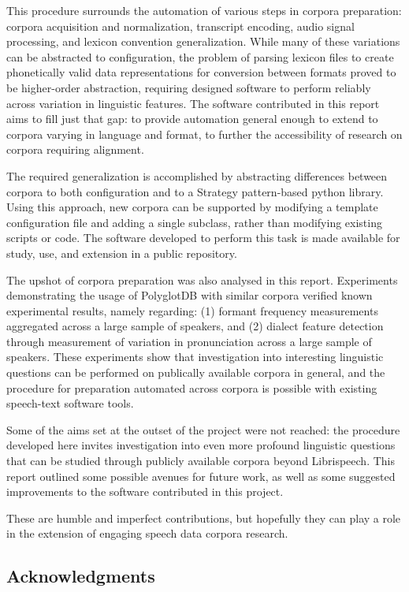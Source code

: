 \documentclass[11pt]{article}
\begin{document}
This procedure surrounds the automation of various steps in corpora preparation: corpora acquisition and normalization, transcript encoding, audio signal processing, and lexicon convention generalization. While many of these variations can be abstracted to configuration, the problem of parsing lexicon files to create phonetically valid data representations for conversion between formats proved to be higher-order abstraction, requiring designed software to perform reliably across variation in linguistic features. The software contributed in this report aims to fill just that gap: to provide automation general enough to extend to corpora varying in language and format, to further the accessibility of research on corpora requiring alignment.

The required generalization is accomplished by abstracting differences between corpora to both configuration and to a Strategy pattern-based python library. Using this approach, new corpora can be supported by modifying a template configuration file and adding a single subclass, rather than modifying existing scripts or code. The software developed to perform this task is made available for study, use, and extension in a public repository.

The upshot of corpora preparation was also analysed in this report. Experiments demonstrating the usage of PolyglotDB with similar corpora verified known experimental results, namely regarding: (1) formant frequency measurements aggregated across a large sample of speakers, and (2) dialect feature detection through measurement of variation in pronunciation across a large sample of speakers. These experiments show that investigation into interesting linguistic questions can be performed on publically available corpora in general, and the procedure for preparation automated across corpora is possible with existing speech-text software tools.

Some of the aims set at the outset of the project were not reached: the procedure developed here invites investigation into even more profound linguistic questions that can be studied through publicly available corpora beyond Librispeech. This report outlined some possible avenues for future work, as well as some suggested improvements to the software contributed in this project.

These are humble and imperfect contributions, but hopefully they can play a role in the extension of engaging speech data corpora research.


\subsection{Acknowledgments}
\end{document}
